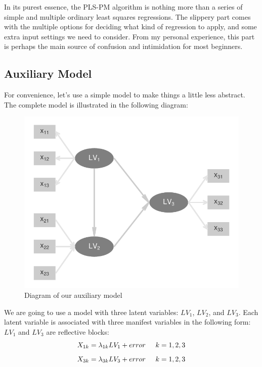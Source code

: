\documentclass[12pt]{book}\usepackage{graphicx, color}
\newenvironment{knitrout}{}{} %
\begin{document}
In its purest essence, the PLS-PM algorithm is nothing more than a series of simple and multiple ordinary least squares regressions. The slippery part comes with the multiple options for deciding what kind of regression to apply, and some extra input settings we need to consider. From my personal experience, this part is perhaps the main source of confusion and intimidation for most beginners. 


\subsection*{Auxiliary Model}
For convenience, let's use a simple model to make things a little less abstract. The complete model is illustrated in the following diagram:




\begin{knitrout}
\color{fgcolor}\begin{figure}[h]


{\centering \includegraphics[width=.7\linewidth,height=.5\linewidth]{figure/auxiliary_path_diagram} 

}

\caption[Diagram of our auxiliary model]{Diagram of our auxiliary model\label{fig:auxiliary_path_diagram}}
\end{figure}


\end{knitrout}



We are going to use a model with three latent variables: $LV_1$, $LV_2$, and $LV_3$. Each latent variable is associated with three manifest variables in the following form: $LV_1$ and $LV_3$ are reflective blocks:
$$ X_{1k} = \lambda_{1k} LV_1 + error \hspace{5mm} k = 1, 2, 3$$
$$ X_{3k} = \lambda_{3k} LV_3 + error \hspace{5mm} k = 1, 2, 3$$
\end{document}

